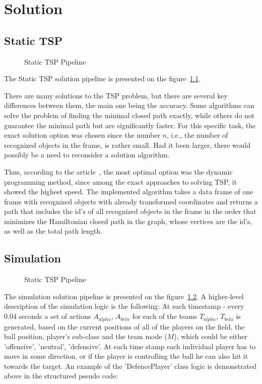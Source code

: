 \chapter{Solution}

\section{Static TSP}
\begin{figure}[ht!]
    \centering
    
    \caption{Static TSP Pipeline}
    \label{fig:tsp}
\end{figure}
The Static TSP solution pipeline is presented on the figure~\ref{fig:tsp}.

There are many solutions to the TSP problem, but there are several key differences between them, the main one being the accuracy. Some algorithms can solve the problem of finding the minimal closed path exactly, while others do not guarantee the minimal path but are significantly faster. For this specific task, the exact solution option was chosen since the number $n$, i.e., the number of recognized objects in the frame, is rather small. Had it been larger, there would possibly be a need to reconsider a solution algorithm.

Thus, according to the article~\cite{Zhang_2021}, the most optimal option was the dynamic programming method, since among the exact approaches to solving TSP, it showed the highest speed. The implemented algorithm takes a data frame of one frame with recognized objects with already transformed coordinates and returns a path that includes the id's of all recognized objects in the frame in the order that minimizes the Hamiltonian closed path in the graph, whose vertices are the id's, as well as the total path length. 
\newpage
\section{Simulation}
\begin{figure}[ht!]
    \centering
    
    \caption{Static TSP Pipeline}
    \label{fig:sim}
\end{figure}
The simulation solution pipeline is presented on the figure~\ref{fig:sim}.
A higher-level description of the simulation logic is the following:
At each timestamp - every 0.04 seconds a set of actions $A_{alpha}$, $A_{beta}$ for each of the teams $T_{alpha}$, $T_{beta}$ is generated, based on the current positions of all of the players on the field, the ball position, player's sub-class and the team mode ($M$), which could be either {'offensive', 'neutral', 'defensive'}. At each time stamp each individual player has to move in some direction, or if the player is controlling the ball he can also hit it towards the target. An example of the 'DefencePlayer' class logic is demonstrated above in the structured pseudo code:


